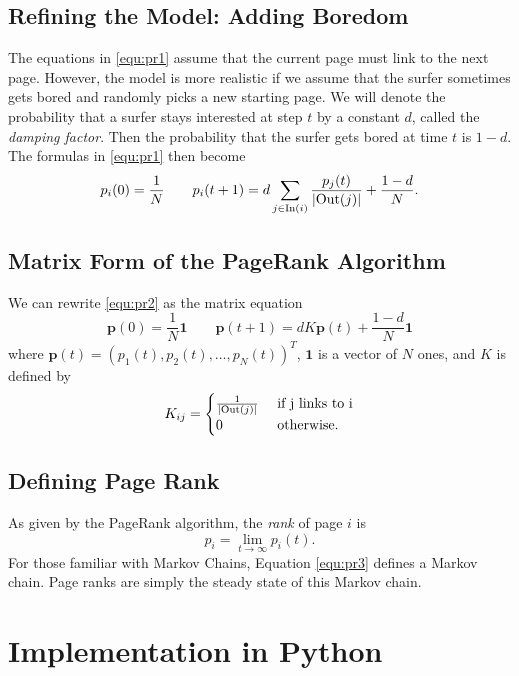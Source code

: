 \subsection*{Refining the Model: Adding Boredom}
The equations in \eqref{equ:pr1} assume that the current page must link to the next page.
However, the model is more realistic if we assume that the surfer sometimes gets bored and randomly picks a new starting page.
We will denote the probability that a surfer stays interested at step $t$ by a constant $d$, called the \emph{damping factor}.
Then the probability that the surfer gets bored at time $t$ is $1-d$.
The formulas in \eqref{equ:pr1} then become
\begin{equation}\label{equ:pr2}
p_i(0)=\frac{1}{N} \qquad p_i(t+1) = d\sum_{j \in \operatorname{In}(i)} \frac{p_j(t)}{\left\lvert\operatorname{Out}(j)\right\rvert}+\frac{1-d}{N} .
\end{equation}

\subsection*{Matrix Form of the PageRank Algorithm}
We can rewrite \eqref{equ:pr2} as the matrix equation
\begin{equation}\label{equ:pr3}
\mathbf{p}(0)=\frac{1}{N}\mathbf{1} \qquad \mathbf{p}(t+1) = dK\mathbf{p}(t) + \frac{1-d}{N}\mathbf{1}
\end{equation}
where $\mathbf{p}(t)=(p_1(t), p_2(t), \ldots, p_N(t))^T$,
$\mathbf{1}$ is a vector of $N$ ones,
and $K$ is defined by
\[K_{ij} = \begin{cases} \frac{1}{\left\lvert\operatorname{Out}(j)\right\rvert} & \mbox{ if j links to i} \\
  0 & \mbox{ otherwise.} \end{cases}\]


\subsection*{Defining Page Rank}
As given by the PageRank algorithm, the \emph{rank} of page $i$ is
\[p_i = \lim_{t\to \infty} p_i(t).\]
For those familiar with Markov Chains, Equation \ref{equ:pr3} defines a Markov chain. Page ranks are simply the steady state of this Markov chain.


\section*{Implementation in Python}



